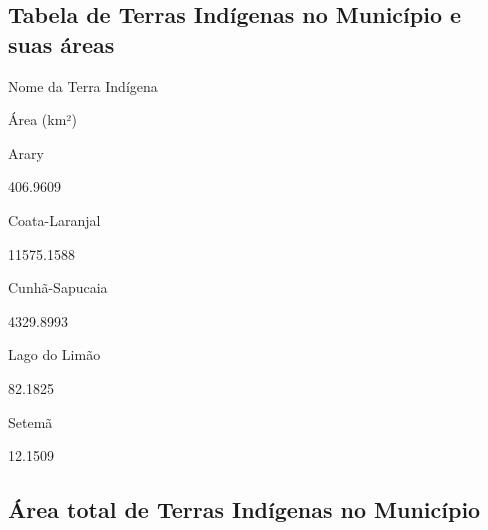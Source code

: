 \documentclass[
  letterpaper,
]{report}
\begin{document}
\hypertarget{tabela-de-terras-induxedgenas-no-municuxedpio-e-suas-uxe1reas-1}{%
\subsection{Tabela de Terras Indígenas no Município e suas
áreas}\label{tabela-de-terras-induxedgenas-no-municuxedpio-e-suas-uxe1reas-1}}

\n  

\n    

\n      

Nome da Terra Indígena

\n      

Área (km²)

\n    

\n  

\n  

\n    

\n      

Arary

\n      

406.9609

\n    

\n    

\n      

Coata-Laranjal

\n      

11575.1588

\n    

\n    

\n      

Cunhã-Sapucaia

\n      

4329.8993

\n    

\n    

\n      

Lago do Limão

\n      

82.1825

\n    

\n    

\n      

Setemã

\n      

12.1509

\n    

\n  

\n

\hypertarget{uxe1rea-total-de-terras-induxedgenas-no-municuxedpio-1}{%
\subsection{Área total de Terras Indígenas no
Município}\label{uxe1rea-total-de-terras-induxedgenas-no-municuxedpio-1}}
\end{document}
